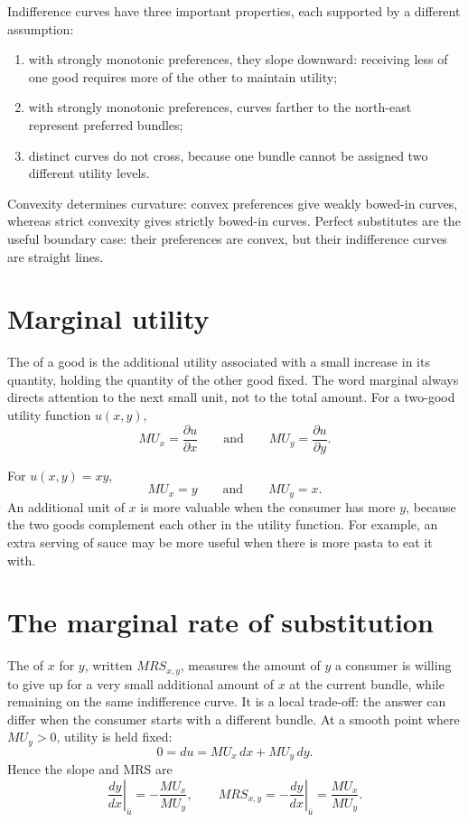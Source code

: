 Indifference curves have three important properties, each supported by a
different assumption:
\begin{enumerate}
  \item with strongly monotonic preferences, they slope downward: receiving less of one good requires more of the other to maintain utility;
  \item with strongly monotonic preferences, curves farther to the north-east represent preferred bundles;
  \item distinct curves do not cross, because one bundle cannot be assigned two different utility levels.
\end{enumerate}
Convexity determines curvature: convex preferences give weakly bowed-in curves,
whereas strict convexity gives strictly bowed-in curves. Perfect substitutes
are the useful boundary case: their preferences are convex, but their
indifference curves are straight lines.

\section{Marginal utility}

The  of a good is the additional utility associated
with a small increase in its quantity, holding the quantity of the other good
fixed. The word marginal always directs attention to the next small unit, not
to the total amount. For a two-good utility function $u(x,y)$,
\[
MU_x=\frac{\partial u}{\partial x}
\qquad\text{and}\qquad
MU_y=\frac{\partial u}{\partial y}.
\]

For $u(x,y)=xy$,
\[
MU_x=y
\qquad\text{and}\qquad
MU_y=x.
\]
An additional unit of $x$ is more valuable when the consumer has more $y$,
because the two goods complement each other in the utility function. For
example, an extra serving of sauce may be more useful when there is more pasta
to eat it with.

\section{The marginal rate of substitution}

The  of $x$ for $y$, written
$MRS_{x,y}$, measures the amount of $y$ a consumer is willing to give up for a
very small additional amount of $x$ at the current bundle, while remaining on
the same indifference curve. It is a local trade-off: the answer can differ
when the consumer starts with a different bundle. At a smooth point where
$MU_y>0$, utility is held fixed:
\[
0=du=MU_x\,dx+MU_y\,dy.
\]
Hence the slope and MRS are
\[
\left.\frac{dy}{dx}\right|_{\bar u}
=-\frac{MU_x}{MU_y},
\qquad
MRS_{x,y}
=-\left.\frac{dy}{dx}\right|_{\bar u}
=\frac{MU_x}{MU_y}.
\]

